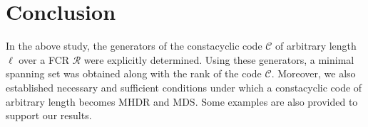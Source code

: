 \documentclass[12pt,a4paper]{article}
\begin{document}
\section{Conclusion}\label{sec:conc}
In the above study, the generators of the constacyclic code $\mathcal{C}$ of arbitrary length $\ell$ over a FCR $\mathcal{R}$ were explicitly determined. Using these generators, a minimal spanning set was obtained along with the rank of the code $\mathcal{C}$. Moreover, we also established necessary and sufficient conditions under which a constacyclic code of arbitrary length becomes MHDR and MDS. Some examples are also provided to support our results.




\printbibliography
\end{document}

